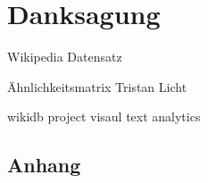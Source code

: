 \cleardoublepage
\clearpage



\newpage
\let\cleardoublepage\clearpage
\chapter*{Danksagung}

Wikipedia Datensatz

Ähnlichkeitsmatrix Tristan Licht

wikidb project visaul text analytics









%

\printbibliography

% 
% 



\newpage
\begin{appendices}
\chapter{Anhang}
\label{chap:anhang}


\end{appendices}
%




